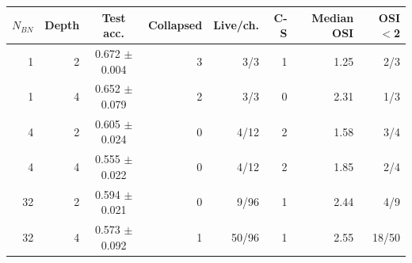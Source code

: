 \begin{tabular}{rrcrrrrr}
\toprule
$N_{BN}$ & Depth & Test acc. & Collapsed & Live/ch. & C-S & Median OSI & OSI$<$2 \\
\midrule
1 & 2 & 0.672 $\pm$ 0.004 & 3 & 3/3 & 1 & 1.25 & 2/3 \\
1 & 4 & 0.652 $\pm$ 0.079 & 2 & 3/3 & 0 & 2.31 & 1/3 \\
4 & 2 & 0.605 $\pm$ 0.024 & 0 & 4/12 & 2 & 1.58 & 3/4 \\
4 & 4 & 0.555 $\pm$ 0.022 & 0 & 4/12 & 2 & 1.85 & 2/4 \\
32 & 2 & 0.594 $\pm$ 0.021 & 0 & 9/96 & 1 & 2.44 & 4/9 \\
32 & 4 & 0.573 $\pm$ 0.092 & 1 & 50/96 & 1 & 2.55 & 18/50 \\
\bottomrule
\end{tabular}
